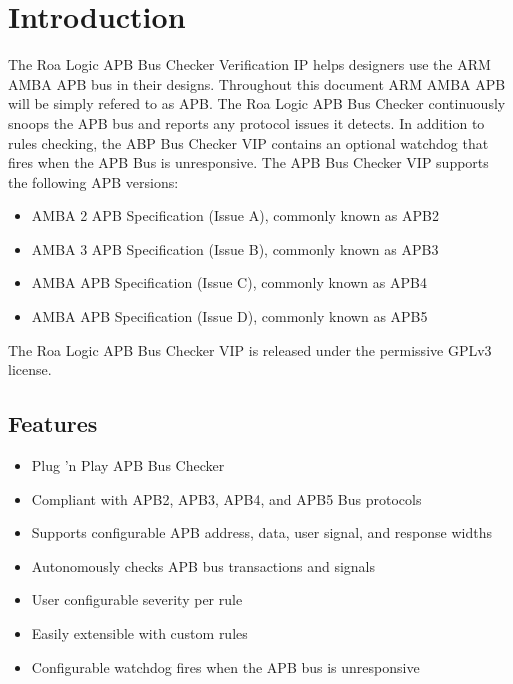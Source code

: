 \chapter{Introduction} \label{introduction}

The Roa Logic APB Bus Checker Verification IP helps designers use the ARM\textsuperscript{\textregistered}  AMBA\textsuperscript{\textregistered}  APB\textsuperscript{\cite{ArmAPB}} bus in their designs. Throughout this document ARM\textsuperscript{\textregistered}  AMBA\textsuperscript{\textregistered}  APB will be simply refered to as APB.
The Roa Logic APB Bus Checker continuously snoops the APB bus and reports any protocol issues it detects.
In addition to rules checking, the ABP Bus Checker VIP contains an optional watchdog that fires when the APB Bus is unresponsive.
The APB Bus Checker VIP supports the following APB versions:
\begin{itemize}
\item
  AMBA 2 APB Specification (Issue A), commonly known as APB2
\item
  AMBA 3 APB Specification (Issue B), commonly known as APB3
\item
  AMBA APB Specification (Issue C), commonly known as APB4
\item
  AMBA APB Specification (Issue D), commonly known as APB5
\end{itemize}

The Roa Logic APB Bus Checker VIP is released under the permissive GPLv3 license.


\section{Features}\label{features}

\begin{itemize}
\item
  Plug 'n Play APB Bus Checker
\item
  Compliant with APB2, APB3, APB4, and APB5 Bus protocols
\item
  Supports configurable APB address, data, user signal, and response widths
\item
  Autonomously checks APB bus transactions and signals
\item
  User configurable severity per rule
\item
  Easily extensible with custom rules
\item
  Configurable watchdog fires when the APB bus is unresponsive
\end{itemize}


